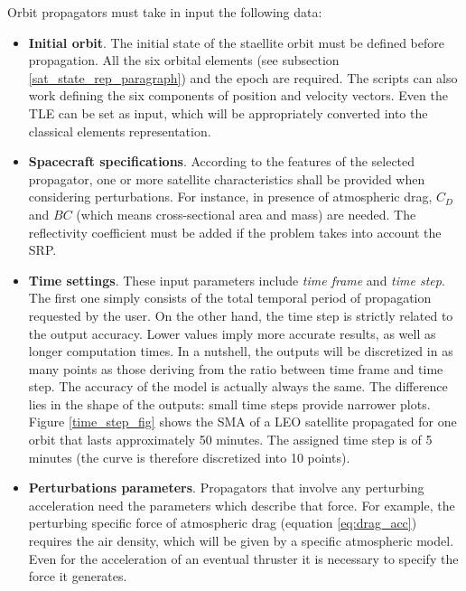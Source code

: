 Orbit propagators must take in input the following data:
\begin{itemize}
    \item \textbf{Initial orbit}. The initial state of the staellite orbit must be defined before propagation.
          All the six orbital elements (see subsection \ref{sat_state_rep_paragraph}) and the epoch are required. 
          The scripts can also work defining the six components of position and velocity vectors.
          Even the TLE can be set as input, which will be appropriately converted into the classical elements representation.  
    \item \textbf{Spacecraft specifications}. According to the features of the selected propagator, one or more satellite characteristics shall be provided when considering perturbations.
          For instance, in presence of atmospheric drag, $C_D$ and $BC$ (which means cross-sectional area and mass) are needed. 
          The reflectivity coefficient must be added if the problem takes into account the SRP.
    \item \textbf{Time settings}. These input parameters include \textit{time frame} and \textit{time step}.
          The first one simply consists of the total temporal period of propagation requested by the user.
          On the other hand, the time step is strictly related to the output accuracy.
          Lower values imply more accurate results, as well as longer computation times.
          In a nutshell, the outputs will be discretized in as many points as those deriving from the ratio between time frame and time step.
          The accuracy of the model is actually always the same. 
          The difference lies in the shape of the outputs: small time steps provide narrower plots. 
          Figure \ref{time_step_fig} shows the SMA of a LEO satellite propagated for one orbit that lasts approximately 50 minutes. The assigned time step is of 5 minutes (the curve is therefore discretized into 10 points).
    \item \textbf{Perturbations parameters}. Propagators that involve any perturbing acceleration need the parameters which describe that force. 
          For example, the perturbing specific force of atmospheric drag (equation \ref{eq:drag_acc}) requires the air density, which will be given by a specific atmospheric model.
          Even for the acceleration of an eventual thruster it is necessary to specify the force it generates.
\end{itemize}

